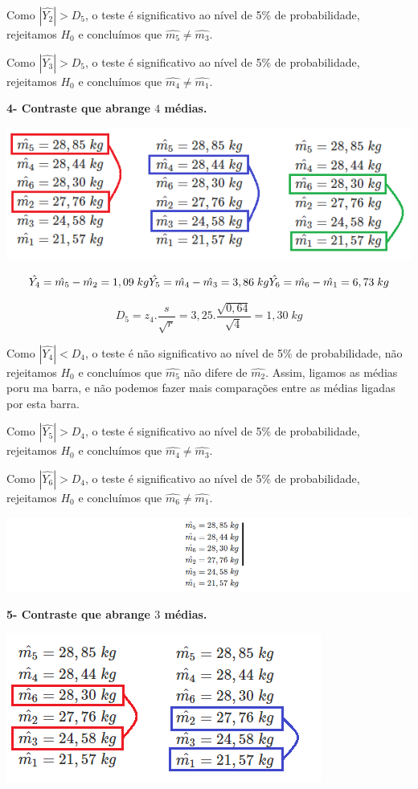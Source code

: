\documentclass[
]{book}
\begin{document}
Como \(|\hat{Y_2}|>D_5\), o teste é significativo ao nível de 5\% de probabilidade, rejeitamos \(H_0\) e concluímos que \(\hat{m_5} \neq \hat{m_3}\).

Como \(|\hat{Y_3}|>D_5\), o teste é significativo ao nível de 5\% de probabilidade, rejeitamos \(H_0\) e concluímos que \(\hat{m_4} \neq \hat{m_1}\).

\textbf{4- Contraste que abrange \(4\) médias.}

\includegraphics{m4.png}

\[
\hat{Y_4} = \hat{m_5} - \hat{m_2} = 1,09\;kg \\
\hat{Y_5} = \hat{m_4} - \hat{m_3} = 3,86\;kg \\
\hat{Y_6} = \hat{m_6} - \hat{m_1} = 6,73\;kg
\]

\[
D_{5} = z_4.\frac{s}{\sqrt{r}} = 3,25.\frac{\sqrt{0,64}}{\sqrt{4}} = 1,30\;kg
\]

Como \(|\hat{Y_4}|<D_4\), o teste é não significativo ao nível de 5\% de probabilidade, não rejeitamos \(H_0\) e concluímos que \(\hat{m_5}\) não difere de \(\hat{m_2}\). Assim, ligamos as médias poru ma barra, e não podemos fazer mais comparações entre as médias ligadas por esta barra.

Como \(|\hat{Y_5}|>D_4\), o teste é significativo ao nível de 5\% de probabilidade, rejeitamos \(H_0\) e concluímos que \(\hat{m_4} \neq \hat{m_3}\).

Como \(|\hat{Y_6}|>D_4\), o teste é significativo ao nível de 5\% de probabilidade, rejeitamos \(H_0\) e concluímos que \(\hat{m_6} \neq \hat{m_1}\).

\includegraphics{m4_1.png}

\textbf{5- Contraste que abrange \(3\) médias.}

\includegraphics{m3.png}
\end{document}
